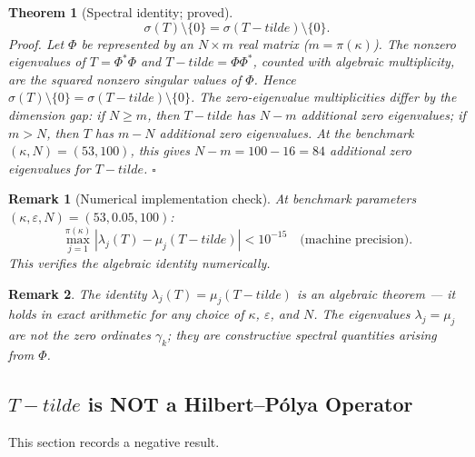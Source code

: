 \documentclass[11pt]{article}
\def\Tt{T-tilde}%
\newtheorem{theorem}{Theorem}[section]
\newtheorem*{remark}{Remark}
\newcommand{\Tt}{\widetilde{T}}
\begin{document}
\begin{theorem}[Spectral identity; proved]\label{thm:spectral-identity}
\[
\sigma(T)\setminus\{0\} = \sigma(\Tt)\setminus\{0\}.
\]
\emph{Proof.}
Let $\Phi$ be represented by an $N\times m$ real matrix
($m=\pi(\kappa)$). The nonzero eigenvalues of $T=\Phi^*\Phi$
and $\Tt=\Phi\Phi^*$, counted with algebraic multiplicity,
are the squared nonzero singular values of $\Phi$.
Hence $\sigma(T)\setminus\{0\}=\sigma(\Tt)\setminus\{0\}$.
The zero-eigenvalue multiplicities differ by the dimension gap:
if $N\ge m$, then $\Tt$ has $N-m$ additional zero eigenvalues;
if $m>N$, then $T$ has $m-N$ additional zero eigenvalues.
At the benchmark $(\kappa,N)=(53,100)$, this gives
$N-m=100-16=84$ additional zero eigenvalues for $\Tt$. $\square$
\end{theorem}

\begin{remark}[Numerical implementation check]
At benchmark parameters $(\kappa,\varepsilon,N)=(53,0.05,100)$:
\[
\max_{j=1}^{\pi(\kappa)}|\lambda_j(T) - \mu_j(\Tt)| < 10^{-15}
\quad\text{(machine precision)}.
\]
This verifies the algebraic identity numerically.
\end{remark}

\begin{remark}
The identity $\lambda_j(T)=\mu_j(\Tt)$ is an \emph{algebraic} theorem
--- it holds in exact arithmetic for any choice of $\kappa$, $\varepsilon$,
and $N$.
The eigenvalues $\lambda_j = \mu_j$ are not the zero ordinates $\gamma_k$;
they are constructive spectral quantities arising from $\Phi$.
\end{remark}

\subsection{$\Tt$ is NOT a Hilbert--P\'olya Operator}

This section records a negative result.
\end{document}

